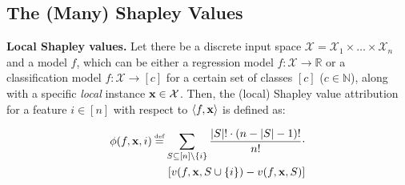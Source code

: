 \subsection{The (Many) Shapley Values}


\textbf{Local Shapley values.} %
Let there be a discrete input space $\mathcal{X} = \mathcal{X}_{1} \times \ldots \times \mathcal{X}_{n}$ and a model $f$, which can be either a regression model $f:\mathcal{X}\to \mathbb{R}$ or a classification model $f:\mathcal{X}\to[c]$ for a certain set of classes $[c]$ ($c\in \mathbb{N}$), along with a specific \emph{local} instance $\textbf{x} \in \mathcal{X}$. Then, the (local) Shapley value attribution for a feature $i \in [n]$ with respect to $\langle f,\textbf{x}\rangle$ is defined as:

\begin{equation}
\begin{aligned}
\phi(f,\x,i)\myeq\sum_{S \subseteq [n] \setminus \{i\}} \frac{|S|!\cdot (n - |S| - 1)!}{n!} \nonumber \cdot \\
\!\!\!\!\!\! \left[ v(f,\x, S \cup \{i\}) - v(f,\x,S) \right] \label{eq:genericshap}
\end{aligned}
\end{equation}

